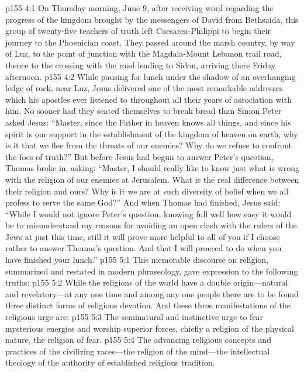 \vs p155 4:1 On Thursday morning, June 9, after receiving word regarding the progress of the kingdom brought by the messengers of David from Bethsaida, this group of twenty\hyp{}five teachers of truth left Caesarea\hyp{}Philippi to begin their journey to the Phoenician coast. They passed around the marsh country, by way of Luz, to the point of junction with the Magdala\hyp{}Mount Lebanon trail road, thence to the crossing with the road leading to Sidon, arriving there Friday afternoon.
\vs p155 4:2 While pausing for lunch under the shadow of an overhanging ledge of rock, near Luz, Jesus delivered one of the most remarkable addresses which his apostles ever listened to throughout all their years of association with him. No sooner had they seated themselves to break bread than Simon Peter asked Jesus: “Master, since the Father in heaven knows all things, and since his spirit is our support in the establishment of the kingdom of heaven on earth, why is it that we flee from the threats of our enemies? Why do we refuse to confront the foes of truth?” But before Jesus had begun to answer Peter’s question, Thomas broke in, asking: “Master, I should really like to know just what is wrong with the religion of our enemies at Jerusalem. What is the real difference between their religion and ours? Why is it we are at such diversity of belief when we all profess to serve the same God?” And when Thomas had finished, Jesus said: \textcolor{ubdarkred}{“While I would not ignore Peter’s question, knowing full well how easy it would be to misunderstand my reasons for avoiding an open clash with the rulers of the Jews at just this time, still it will prove more helpful to all of you if I choose rather to answer Thomas’s question. And that I will proceed to do when you have finished your lunch.”}
\vs p155 5:1 This memorable discourse on religion, summarized and restated in modern phraseology, gave expression to the following truths:
\pc \vs p155 5:2 While the religions of the world have a double origin---natural and revelatory---at any one time and among any one people there are to be found three distinct forms of religious devotion. And these three manifestations of the religious urge are:
\pc \vs p155 5:3 \bibnobreakspace {} The seminatural and instinctive urge to fear mysterious energies and worship superior forces, chiefly a religion of the physical nature, the religion of fear.
\pc \vs p155 5:4 \bibnobreakspace {} The advancing religious concepts and practices of the civilizing races---the religion of the mind---the intellectual theology of the authority of established religious tradition.
